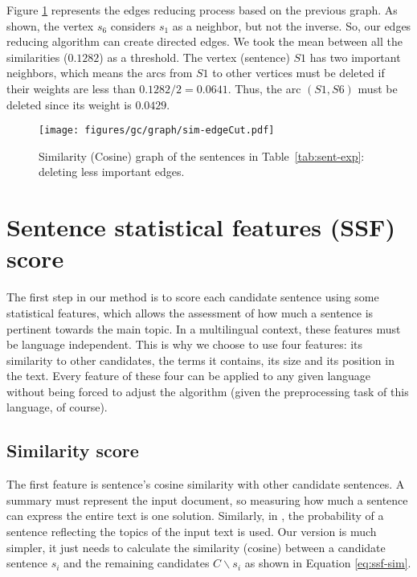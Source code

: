 Figure \ref{fig:edgeCut} represents the edges reducing process based on the previous graph. 
As shown, the vertex $ s_6 $ considers $ s_1 $ as a neighbor, but not the inverse. 
So, our edges reducing algorithm can create directed edges.
We took the mean between all the similarities ($ 0.1282 $) as a threshold. 
The vertex (sentence) $ S1 $ has two important neighbors, which means the arcs from $ S1 $ to other vertices must be deleted if their weights are less than $ 0.1282/2 = 0.0641 $. 
Thus, the arc $ (S1, S6) $ must be deleted since its weight is $ 0.0429 $.
\begin{figure}[ht]
	\centering
	\texttt{[image: figures/gc/graph/sim-edgeCut.pdf]} %
	\caption{Similarity (Cosine) graph of the sentences in Table~\ref{tab:sent-exp}: deleting less important edges.}
	\label{fig:edgeCut}
\end{figure}


\section{Sentence statistical features (SSF) score}

The first step in our method is to score each candidate sentence using some statistical features, which allows the assessment of how much a sentence is pertinent towards the main topic. 
In a multilingual context, these features must be language independent. 
This is why we choose to use four features: its similarity to other candidates, the terms it contains, its size and its position in the text. 
Every feature of these four can be applied to any given language without being forced to adjust the algorithm (given the preprocessing task of this language, of course).

\subsection{Similarity score}

The first feature is sentence's cosine similarity with other candidate sentences. 
A summary must represent the input document, so measuring how much a sentence can express the entire text is one solution.
Similarly, in \citep{13-aries-al}, the probability of a sentence reflecting the topics of the input text is used.
Our version is much simpler, it just needs to calculate the similarity (cosine) between a candidate sentence $ s_i $ and the remaining candidates $ C\backslash s_i $ as shown in Equation \ref{eq:ssf-sim}.

